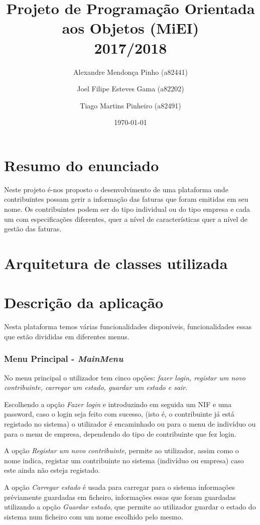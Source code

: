 \documentclass[12pt]{report}
\title{Projeto de Programação Orientada aos Objetos (MiEI) \\ 2017/2018}
\author{Alexandre Mendonça Pinho (a82441) \and Joel Filipe Esteves Gama (a82202) \and Tiago Martins Pinheiro (a82491)}
\date{\today}
\newcommand\tab[1][0.5cm]{\hspace*{#1}}
\begin{document}
\maketitle

\tableofcontents

\chapter{Resumo do enunciado}
\label{sec:resumo}

\tab Neste projeto é-nos proposto o desenvolvimento de uma plataforma onde contribuintes possam gerir a informação das faturas que foram emitidas em seu nome. Os contribuintes podem ser do tipo individual ou do tipo empresa e cada um com especificações diferentes, quer a nível de características quer a nível de gestão das faturas.

\chapter{Arquitetura de classes utilizada}
\label{sec:resumo}

\chapter{Descrição da aplicação}
\label{sec:resumo}
\tab Nesta plataforma temos várias funcionalidades disponíveis, funcionalidades essas que estão divididas em diferentes menus.

\subsection{Menu Principal - \textit{MainMenu}}
\tab No menu principal o utilizador tem cinco opções: \textit{fazer login, registar um novo contribuinte, carregar um estado, guardar um estado e sair}.

Escolhendo a opção \textit{Fazer login} e introduzindo em seguida um NIF e uma password, caso o login seja feito com sucesso, (isto é, o contribuinte já está registado no sistema) o utilizador é encaminhado ou para o menu de indivíduo ou para o menu de empresa, dependendo do tipo de contribuinte que fez login.

A opção \textit{Registar um novo contribuinte}, permite ao utilizador, assim como o nome indica, registar um contribuinte no sistema (indivíduo ou empresa) caso este ainda não esteja registado.

A opção \textit{Carregar estado} é usada para carregar para o sistema informações préviamente guardadas em ficheiro, informações essas que foram guardadas utilizando a opção \textit{Guardar estado}, que permite ao utilizador guardar o estado do sistema num ficheiro com um nome escolhido pelo mesmo.
\end{document}
